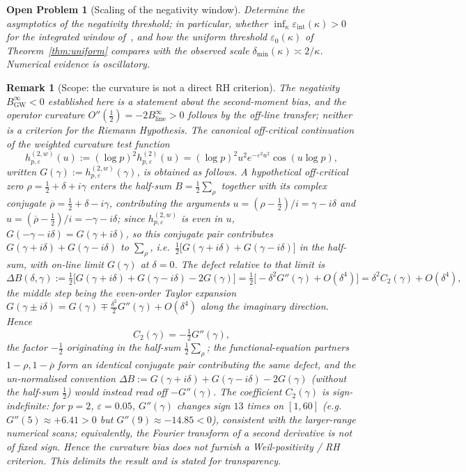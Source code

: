 \documentclass[11pt]{article}
\newtheorem*{remark}{Remark}
\newtheorem{openproblem}[theorem]{Open Problem}
\newcommand{\BinfGW}{B_{\mathrm{GW}}^{\infty}}   %
\newcommand{\Binfline}{B_{\mathrm{line}}^{\infty}} %
\newcommand{\dmin}{\delta_{\min}}           %
\begin{document}
\begin{openproblem}[Scaling of the negativity window]
\label{op:scaling}
Determine the asymptotics of the negativity threshold; in particular,
whether $\inf_\kappa\varepsilon_{\mathrm{int}}(\kappa)>0$ for the integrated
window of~\cite{Paper7}, and how the uniform threshold $\varepsilon_0(\kappa)$
of Theorem~\ref{thm:uniform} compares with the observed scale
$\dmin(\kappa)\asymp 2/\kappa$.
Numerical evidence is oscillatory.
\end{openproblem}

\begin{remark}[Scope: the curvature is not a direct RH criterion]
The negativity $\BinfGW<0$ established here is a statement about the
second-moment bias, and the operator curvature
$O''(\tfrac12)=-2\Binfline>0$ follows by the off-line transfer; neither is a
criterion for the Riemann Hypothesis.
The canonical off-critical continuation of the weighted curvature test
function
\[
h^{(2,w)}_{p,\varepsilon}(u):=(\log p)^2 h^{(2)}_{p,\varepsilon}(u)
=(\log p)^2 u^2 e^{-\varepsilon^2 u^2}\cos(u\log p),
\]
written $G(\gamma):=h^{(2,w)}_{p,\varepsilon}(\gamma)$, is obtained as follows.
A hypothetical off-critical zero $\rho=\tfrac12+\delta+i\gamma$ enters the
half-sum $B=\tfrac12\sum_\rho$ together with its complex conjugate
$\overline\rho=\tfrac12+\delta-i\gamma$, contributing the arguments
$u=(\rho-\tfrac12)/i=\gamma-i\delta$ and $u=(\overline\rho-\tfrac12)/i=-\gamma-i\delta$;
since $h^{(2,w)}_{p,\varepsilon}$ is even in $u$, $G(-\gamma-i\delta)=G(\gamma+i\delta)$,
so this conjugate pair contributes $G(\gamma+i\delta)+G(\gamma-i\delta)$ to
$\sum_\rho$, i.e.\ $\tfrac12\bigl[G(\gamma+i\delta)+G(\gamma-i\delta)\bigr]$ in the
half-sum, with on-line limit $G(\gamma)$ at $\delta=0$. The defect relative to
that limit is
\[
\Delta B(\delta,\gamma)
:=\tfrac12\bigl[G(\gamma+i\delta)+G(\gamma-i\delta)-2G(\gamma)\bigr]
=\tfrac12\bigl[-\delta^2 G''(\gamma)+O(\delta^4)\bigr]
=\delta^2 C_2(\gamma)+O(\delta^4),
\]
the middle step being the even-order Taylor expansion
$G(\gamma\pm i\delta)=G(\gamma)\mp\tfrac{\delta^2}{2}G''(\gamma)+O(\delta^4)$ along
the imaginary direction. Hence
\[
C_2(\gamma)=-\tfrac12 G''(\gamma),
\]
the factor $-\tfrac12$ originating in the half-sum $\tfrac12\sum_\rho$; the
functional-equation partners $1-\rho,1-\overline\rho$ form an identical conjugate
pair contributing the same defect, and the un-normalised convention
$\Delta B:=G(\gamma+i\delta)+G(\gamma-i\delta)-2G(\gamma)$ (without the half-sum
$\tfrac12$) would instead read off $-G''(\gamma)$. The coefficient $C_2(\gamma)$ is
sign-indefinite: for $p=2$, $\varepsilon=0.05$, $G''(\gamma)$ changes sign $13$
times on $[1,60]$ (e.g.\ $G''(5)\approx+6.41>0$ but $G''(9)\approx-14.85<0$),
consistent with the larger-range numerical scans; equivalently, the
Fourier transform of a second derivative is not of fixed sign.
Hence the curvature bias does not furnish a Weil-positivity / RH criterion.
This delimits the result and is stated for transparency.
\end{remark}
\end{document}
